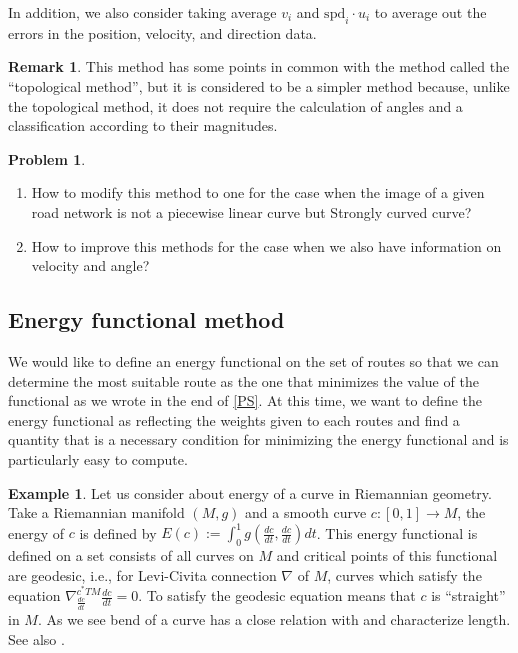 \documentclass{article}
\numberwithin{equation}{section}
\theoremstyle{definition}
\newtheorem{example}[example]{Example}
\newtheorem{remark}[remark]{Remark}
\newtheorem{prob}[prob]{Problem}
\begin{document}
In addition, we also consider taking average $v_{i}$ and $\text{spd}_{i}\cdot u_{i}$ to average out the errors in the position, velocity, and direction data.

\begin{remark}
This method has some points in common with the method called the ``topological method''\cite{QOZN}, but it is considered to be a simpler method because, unlike the topological method, it does not require the calculation of angles and a classification according to their magnitudes.
\end{remark}

\begin{prob}
    \begin{enumerate}
        \item
        How to modify this method to one for the case when the image of a given road network is not a piecewise linear curve but Strongly curved curve?
        \item
        How to improve this methods for the case when we also have information on velocity and angle?
    \end{enumerate}
\end{prob}

\subsection{Energy functional method}

We would like to define an energy functional on the set of routes so that we can determine the most suitable route as the one that minimizes the value of the functional as we wrote in the end of \autoref{PS}.
At this time, we want to define the energy functional as reflecting the weights given to each routes and find a quantity that is a necessary condition for minimizing the energy functional and is particularly easy to compute.

\begin{example}
Let us consider about energy of a curve in Riemannian geometry.
Take a Riemannian manifold $(M,g)$ and a smooth curve $c:[0,1]\to M$, the energy of $c$ is defined by $E(c):=\int_{0}^{1}g(\frac{dc}{dt}, \frac{dc}{dt})dt$. This energy functional is defined on a set consists of all curves on $M$ and critical points of this functional are geodesic, i.e., for Levi-Civita connection $\nabla$ of $M$, curves which satisfy the equation $\nabla^{c^{*}TM}_{\frac{dc}{dt}}\frac{dc}{dt} = 0$. To satisfy the geodesic equation  means that $c$ is ``straight'' in $M$. As we see bend of a curve has a close relation with and characterize length.
See also \cite{Jo}.
\end{example}
\end{document}
